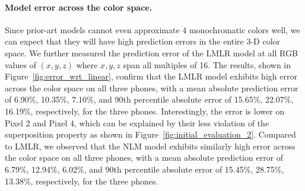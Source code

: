 \paragraph{Model error across the color space.}
%  
Since prior-art models cannot even approximate 4 monochromatic
colors well, we can expect that they will have high prediction errors
in the entire 3-D color space. We further measured
the prediction error of the {LMLR} model at all RGB values of $(x, y,
z)$ where $x, y, z$ span all multiples of 16. The results, shown
in Figure~\ref{fig:error_wrt_linear}, confirm that the {LMLR} model
exhibits high error across the color space on all three phones,
with a mean absolute prediction error of 6.90\%, 10.35\%, 7.10\%,
and 90th percentile absolute error of  15.65\%, 22.07\%, 16.19\%,
respectively, for the three phones.
Interestingly, the error is lower on Pixel 2 and Pixel 4, which can be explained
by their less violation of the superposition property as shown in Figure~\ref{fig:initial_evaluation_2}.
Compared to LMLR, 
we observed that the {NLM} model 
exhibits similarly high error across the color space on all three phones,
with a mean absolute prediction error of 6.79\%, 12.94\%, 6.02\%,
and 90th percentile absolute error of  15.45\%, 28.75\%, 13.38\%,
respectively, for the three phones.

